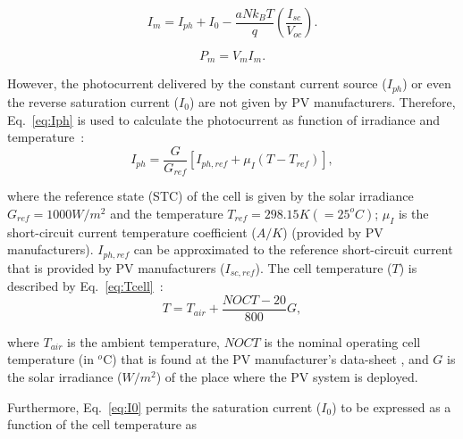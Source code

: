 \documentclass[journal]{IEEEtran}
\begin{document}
\begin{equation}
\label{eq:Imfinal}
I_{m} = I_{ph} + I_{0} - \dfrac{aNk_{B}T}{q} \left( \dfrac{I_{sc}}{V_{oc}} \right).  
\end{equation}

\begin{equation}
\label{eq:Pm}
P_{m} = V_{m} I_{m}.
\end{equation}

%
However, the photocurrent delivered by the constant current source ($I_{ph}$) or even the reverse saturation current ($ I_{0} $) are not given by PV manufacturers. Therefore, Eq.~\eqref{eq:Iph} is used to calculate the photocurrent as function of irradiance and temperature~\cite{Villalva}:
\begin{equation}
\label{eq:Iph}
I_{ph}=\dfrac{G}{G_{ref}} \left[ I_{ph,ref} + \mu_{I} \left( T-T_{ref} \right)    \right], 
\end{equation}

\noindent where the reference state (STC) of the cell is given by the solar irradiance $ G_{ref}=1000 W/m^{2} $ and the temperature $ T_{ref}=298.15 K (=25^{o}C) $; $ \mu_{I} $ is the short-circuit current temperature coefficient ($A/K$) %
(provided by PV manufacturers). $ I_{ph,ref} $ can be approximated to the reference short-circuit current \cite{Jakhrani} that is provided by PV manufacturers ($ I_{sc,ref} $).
%
The cell temperature ($ T $) is described by Eq.~\ref{eq:Tcell}~\cite{Ross}:
\begin{equation}
\label{eq:Tcell}
T = T_{air} + \dfrac{NOCT-20}{800}G,
\end{equation}

\noindent where $ T_{air} $ is the ambient temperature, $NOCT$ is the nominal operating cell temperature (in $^{o}$C) that is found at the PV manufacturer's data-sheet \cite{Ross}, and $G$ is the solar irradiance ($ W/m^{2} $) of the place where the PV system is deployed.

Furthermore, Eq.~\eqref{eq:I0} permits the saturation current ($ I_{0} $) to be expressed as a function of the cell temperature as~\cite{Villalva} 
\end{document}
